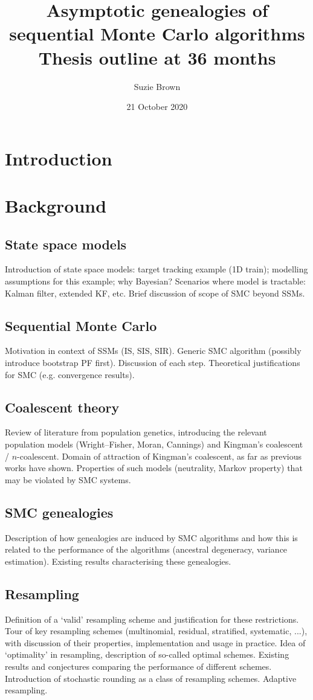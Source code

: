 \documentclass{article}
\title{Asymptotic genealogies of sequential Monte Carlo algorithms\\Thesis outline at 36 months}
\author{Suzie Brown}
\date{21 October 2020}
\begin{document}
\maketitle

\section{Introduction}

\section{Background}
\subsection{State space models}
Introduction of state space models: target tracking example (1D train); modelling assumptions for this example; why Bayesian?
Scenarios where model is tractable: Kalman filter, extended KF, etc.
Brief discussion of scope of SMC beyond SSMs.
\subsection{Sequential Monte Carlo}
Motivation in context of SSMs (IS, SIS, SIR). Generic SMC algorithm (possibly introduce bootstrap PF first). Discussion of each step.
Theoretical justifications for SMC (e.g. convergence results).
\subsection{Coalescent theory}
Review of literature from population genetics, introducing the relevant population models (Wright--Fisher, Moran, Cannings) and Kingman's coalescent / $n$-coalescent. Domain of attraction of Kingman's coalescent, as far as previous works have shown. Properties of such models (neutrality, Markov property) that may be violated by SMC systems.
\subsection{SMC genealogies}
Description of how genealogies are induced by SMC algorithms and how this is related to the performance of the algorithms (ancestral degeneracy, variance estimation). Existing results characterising these genealogies.
\subsection{Resampling} %
Definition of a `valid' resampling scheme and justification for these restrictions. Tour of key resampling schemes (multinomial, residual, stratified, systematic, ...), with discussion of their properties, implementation and usage in practice. Idea of `optimality' in resampling, description of so-called optimal schemes. Existing results and conjectures comparing the performance of different schemes. Introduction of stochastic rounding as a class of resampling schemes. Adaptive resampling.
\end{document}
